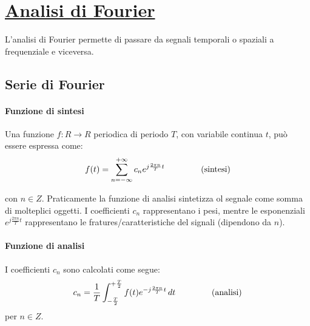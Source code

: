 \documentclass[a4paper, 10pt]{report}
\begin{document}
\section*{\underline{Analisi di Fourier}}
L'analisi di Fourier permette di passare da segnali temporali o spaziali a frequenziale e viceversa.

\subsection*{Serie di Fourier}
\paragraph*{Funzione di sintesi} Una funzione $f: R \rightarrow R$ periodica di periodo $T$, con variabile continua $t$, può essere espressa come:
\begin{align*}
f(t) = \sum_{n=-\infty}^{+\infty} c_ne^{j\frac{2 \pi n}{T} t} \hspace{1.5cm}\text{(sintesi)}
\end{align*}

\noindent con $n \in Z$. Praticamente la funzione di analisi sintetizza ol segnale come somma di molteplici oggetti. I coefficienti $c_n$ rappresentano i pesi, mentre le esponenziali $e^{j\frac{2 \pi n}{T} t}$ rappresentano le fratures/caratteristiche del signali (dipendono da $n$).

\paragraph*{Funzione di analisi} I coefficienti $c_n$ sono calcolati come segue:
\begin{align*}
c_n = \frac{1}{T} \int_{-\frac{T}{2}}^{+\frac{T}{2}} f(t)e^{-j\frac{2 \pi n}{T} t} \, dt \hspace{1.5cm}\text{(analisi)}
\end{align*}
\noindent per $n \in Z$. 
\end{document}
